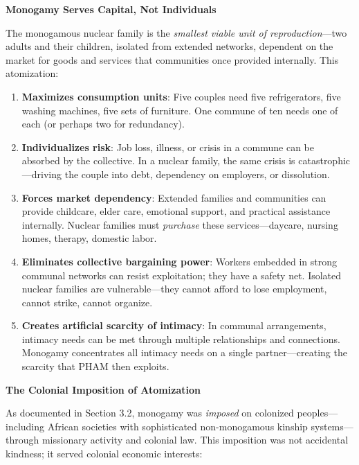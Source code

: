 \documentclass[12pt,openany]{book}
\numberwithin{equation}{chapter}
\begin{document}
\textbf{Monogamy Serves Capital, Not Individuals}

The monogamous nuclear family is the \textit{smallest viable unit of reproduction}---two adults and their children, isolated from extended networks, dependent on the market for goods and services that communities once provided internally. This atomization:

\begin{enumerate}
    \item \textbf{Maximizes consumption units}: Five couples need five refrigerators, five washing machines, five sets of furniture. One commune of ten needs one of each (or perhaps two for redundancy).
    
    \item \textbf{Individualizes risk}: Job loss, illness, or crisis in a commune can be absorbed by the collective. In a nuclear family, the same crisis is catastrophic---driving the couple into debt, dependency on employers, or dissolution.
    
    \item \textbf{Forces market dependency}: Extended families and communities can provide childcare, elder care, emotional support, and practical assistance internally. Nuclear families must \textit{purchase} these services---daycare, nursing homes, therapy, domestic labor.
    
    \item \textbf{Eliminates collective bargaining power}: Workers embedded in strong communal networks can resist exploitation; they have a safety net. Isolated nuclear families are vulnerable---they cannot afford to lose employment, cannot strike, cannot organize.
    
    \item \textbf{Creates artificial scarcity of intimacy}: In communal arrangements, intimacy needs can be met through multiple relationships and connections. Monogamy concentrates all intimacy needs on a single partner---creating the scarcity that PHAM then exploits.
\end{enumerate}

\textbf{The Colonial Imposition of Atomization}

As documented in Section 3.2, monogamy was \textit{imposed} on colonized peoples---including African societies with sophisticated non-monogamous kinship systems---through missionary activity and colonial law. This imposition was not accidental kindness; it served colonial economic interests:
\end{document}
